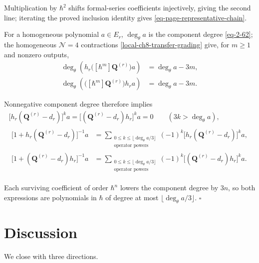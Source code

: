 \documentclass[11pt]{article}
\numberwithin{equation}{section}
\numberwithin{figure}{section}
\numberwithin{table}{section}
\begin{document}
\begin{proofbox}
Multiplication by $\hbar^2$ shifts formal-series coefficients injectively, giving the second line; iterating the proved inclusion identity gives \eqref{eq-page-representative-chain}.

For a homogeneous polynomial $a\in E_r$, $\deg_\theta a$ is the component degree \eqref{eq-2-62}; the homogeneous $\mathcal N=4$ contractions \eqref{local-ch8-transfer-grading} give, for $m\ge1$ and nonzero outputs,
\begin{equation}\label{eq-ch8-transfer-lowering}
\begin{aligned}\deg_\theta\!\left(h_r\bigl([\hbar^m]\mathbf Q^{(r)}\bigr)a\right)&=\deg_\theta a-3m,\\\deg_\theta\!\left(\bigl([\hbar^m]\mathbf Q^{(r)}\bigr)h_ra\right)&=\deg_\theta a-3m.\end{aligned}
\end{equation}

Nonnegative component degree therefore implies
\begin{equation}\label{eq-ch8-transfer-finite-inverses}
\begin{gathered}
\bigl[h_r(\mathbf Q^{(r)}-d_r)\bigr]^k a
=\bigl[(\mathbf Q^{(r)}-d_r)h_r\bigr]^k a=0
\qquad(3k>\deg_\theta a),\\
\begin{aligned}
\bigl[1+h_r(\mathbf Q^{(r)}-d_r)\bigr]^{-1}a
&=\sum_{\substack{0\le k\le\lfloor\deg_\theta a/3\rfloor\\\text{operator powers}}}
(-1)^k\bigl[h_r(\mathbf Q^{(r)}-d_r)\bigr]^k a,\\
\bigl[1+(\mathbf Q^{(r)}-d_r)h_r\bigr]^{-1}a
&=\sum_{\substack{0\le k\le\lfloor\deg_\theta a/3\rfloor\\\text{operator powers}}}
(-1)^k\bigl[(\mathbf Q^{(r)}-d_r)h_r\bigr]^k a.
\end{aligned}
\end{gathered}
\end{equation}

Each surviving coefficient of order $\hbar^n$ lowers the component degree by $3n$, so both expressions are polynomials in $\hbar$ of degree at most $\lfloor\deg_\theta a/3\rfloor$. $\square$
\end{proofbox}

\section{Discussion}\label{sec-conclusion}

We close with three directions.
\end{document}
